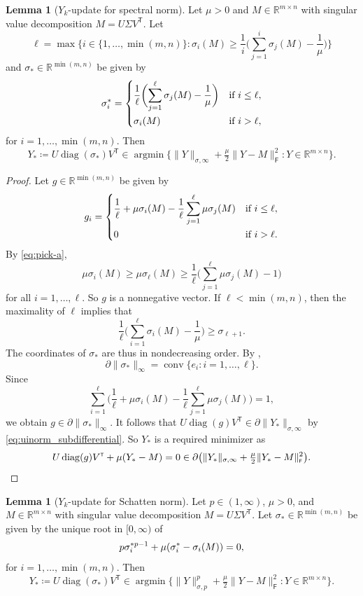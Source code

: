 \documentclass[11pt,reqno]{amsart}
\newcommand{\tp}{{\scriptscriptstyle\mathsf{T}}}
\newcommand{\st}{\sigma}
\newcommand{\F}{{\scriptscriptstyle\mathsf{F}}}
\DeclareMathOperator{\diag}{diag}
\DeclareMathOperator*{\argmin}{argmin}
\DeclareMathOperator{\conv}{conv}
\theoremstyle{definition}
\newtheorem{lemma}[theorem]{Lemma}
\numberwithin{equation}{section}
\newcommand{\R}{\mathbb{R}}
\begin{document}
\begin{lemma}[$Y_k$-update for spectral norm]\label{lem:spec}
Let $\mu>0$ and $M \in \R^{m \times n}$ with  singular value decomposition $M = U\Sigma V^\tp$. Let
\begin{equation}\label{eq:pick-a}
    \ell = \max\biggl\{ i \in \{1,\dots, \min(m,n)\} : \sigma_i(M) \ge \frac{1}{i}\biggl(\sum_{j=1}^i \sigma_j(M) -\frac{1}{\mu}\biggr) \biggr\}
\end{equation}
and $\sigma_* \in \R^{\min(m,n)}$ be given by 
\[\sigma_i^* = 
\begin{dcases}
\frac{1}{\ell} \biggl( \sum_{j=1}^\ell \sigma_j(M) -\frac{1}{\mu} \biggr) & \text{if }   i \le \ell,\\
\sigma_i(M) &\text{if } i > \ell,
\end{dcases}
\]
for $i = 1,\dots, \min(m,n)$.  Then
\[
Y_* \coloneqq U \diag(\sigma_*) V^\tp \in \argmin  \bigl\{ \lVert Y \rVert_{\st,\infty} + \tfrac{\mu}{2} \lVert Y - M \rVert_\F^2 : Y \in \R^{m \times n}\bigr\}.
\]
\end{lemma}
\begin{proof}
Let $g \in \R^{\min(m, n)}$ be given by 
\[
g_{i} = \begin{dcases}
    \frac{1}{\ell} + \mu \sigma_i(M) - \frac{1}{\ell}\sum_{j=1}^\ell \mu \sigma_j(M)  &\text{if } i \le \ell,\\
    0 &\text{if } i > \ell.
    \end{dcases}
\]
By \eqref{eq:pick-a}, 
\[
\mu \sigma_i(M) \ge \mu\sigma_\ell(M) \ge \frac{1}{\ell}\biggl(\sum_{j=1}^\ell \mu\sigma_j(M) -1\biggr)
\]
for all $i = 1,\dots, \ell$. So $g$ is a nonnegative vector. If $\ell <\min(m,n)$, then the maximality of $\ell$ implies that 
\[
\frac{1}{\ell}\biggl(\sum_{i=1}^\ell \sigma_i(M) -\frac{1}{\mu}\biggr) \ge \sigma_{\ell+1}.
\]
The coordinates of $\sigma_*$ are thus in nondecreasing order. By \cite[Example~1]{UIsubdifferential},
\[\partial \lVert \sigma_* \rVert_\infty = \conv \{e_i : i = 1,\dots, \ell \}.\]
Since
\[
    \sum_{i=1}^\ell \biggl( \frac{1}{\ell} + \mu \sigma_i(M) - \frac{1}{\ell}\sum_{j=1}^\ell \mu \sigma_j(M) \biggr) = 1,
\]
we obtain $g \in \partial \lVert \sigma_*\rVert_\infty$. It follows that $U\diag(g)V^\tp \in \partial \lVert Y_* \rVert_{\st,\infty}$ by \eqref{eq:uinorm_subdifferential}. So $Y_*$ is a required minimizer as
\[
    U\diag(g)V^\tp + \mu(Y_*-M) = 0\in \partial \bigl( \lVert Y_* \rVert_{\st,\infty} + \tfrac{\mu}{2} \lVert Y_* - M \rVert_\F^2\bigr). \qedhere
\]
\end{proof}
\begin{lemma}[$Y_k$-update for Schatten norm]\label{lem:sch}
Let $p \in (1,\infty)$, $\mu>0$, and $M \in \R^{m \times n}$ with  singular value decomposition $M = U\Sigma V^\tp$. Let $\sigma_* \in \R^{\min(m,n)}$ be given by the unique root in $[0,\infty)$ of
\[
p\sigma_i^{\ast \smash[b]{p-1}} + \mu (\sigma_i^* - \sigma_i(M)) = 0,
\]
for $ i = 1, \dots, \min(m,n)$. Then
\[
Y_* \coloneqq U \diag(\sigma_*) V^\tp \in \argmin  \bigl\{ \lVert Y\rVert_{\st,p}^p + \tfrac{\mu}{2} \lVert Y - M \rVert_\F^2 : Y \in \R^{m \times n}\bigr\}.
\]
\end{lemma}
\end{document}
